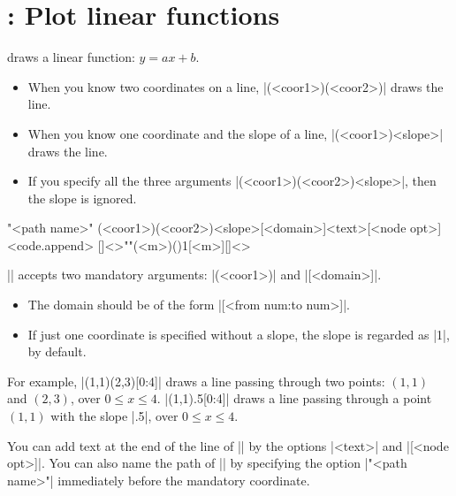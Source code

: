 \section{\protect\cmd{\tzLFn}: Plot linear functions}
\label{s:tzLFn}


\icmd{\tzLFn} draws a linear function: $y=ax+b$.

\begin{itemize}
\item
When you know two coordinates on a line,
|\tzLFn(<coor1>)(<coor2>)| draws the line.
\item
When you know one coordinate and the slope of a line,
|\tzLFn(<coor1>){<slope>}| draws the line.
\item
If you specify all the three arguments |(<coor1>)(<coor2>){<slope>}|, then the slope is ignored.
\end{itemize}

\begin{tzdef}{}
"<path name>"
      (<coor1>)(<coor2>){<slope>}[<domain>]{<text>}[<node opt>]<code.append>
[]<>""(<m>)(){1}[<m>]{}[]<>
\end{tzdef}

|\tzLFn| accepts two mandatory arguments: |(<coor1>)| and |[<domain>]|.
\begin{itemize}
\item The domain should be of the form |[<from num:to num>]|.
\item If just one coordinate is specified without a slope, the slope is regarded as |1|, by default.
\end{itemize}

For example, |\tzLFn(1,1)(2,3)[0:4]| draws a line passing through two points: $(1,1)$ and $(2,3)$, over $0\leq x\leq 4$.
|\tzLFn(1,1){.5}[0:4]| draws a line passing through a point $(1,1)$ with the slope |.5|, over $0\leq x\leq 4$.

You can add text at the end of the line of |\tzLFn| by the options |{<text>}| and |[<node opt>]|. You can also name the path of |\tzLFn| by specifying the option |"<path name>"| immediately before the mandatory coordinate.

\begin{tzcode}{.3}
{}
\end{tzcode}

